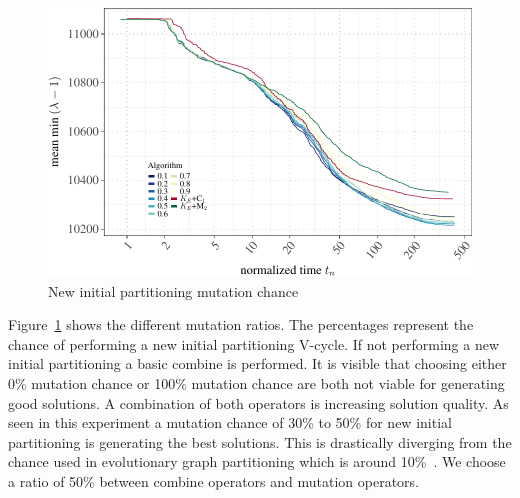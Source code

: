 \documentclass[a4paper,12pt,titlepage, BCOR7mm,headsepline]{scrbook}
\numberwithin{equation}{section}
\begin{document}
\begin{figure}[H]

\begin{center}
\includegraphics{rnw/tuning_subset_plots/mutation_tuning_plot-1}\caption{New initial partitioning mutation chance}\label{fig:mutationchancetuning}
\end{center}

\end{figure}
Figure~\ref{fig:mutationchancetuning} shows the different mutation ratios. The percentages represent the chance of performing a new initial partitioning V-cycle. If not performing a new initial partitioning a basic combine is performed. It is visible that choosing either 0\% mutation chance or 100\% mutation chance are both not viable for generating good solutions. A combination of both operators is increasing solution quality. As seen in this experiment a mutation chance of 30\% to 50\% for new initial partitioning is generating the best solutions. This is drastically diverging from the chance used in evolutionary graph partitioning which is around 10\%~\cite{sanders2012distributed}. We choose a ratio of 50\% between combine operators and mutation operators. 
\end{document}
